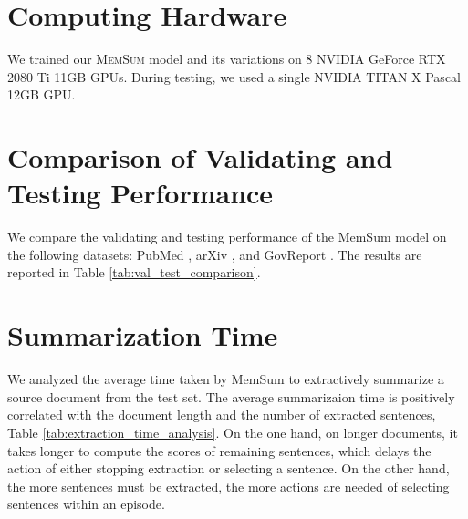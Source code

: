 \documentclass[11pt]{article}
\begin{document}
\section{Computing Hardware}
We trained our \textsc{MemSum} model and its variations on 8 NVIDIA GeForce RTX 2080 Ti 11GB GPUs. During testing, we used a single NVIDIA TITAN X Pascal 12GB GPU.

\section{Comparison of Validating and Testing Performance }

We compare the validating and testing performance of the MemSum model on the following datasets: PubMed \cite{cohan2018discourse}, arXiv \cite{cohan2018discourse}, and GovReport \cite{huang2021efficient}. The results are reported in Table \ref{tab:val_test_comparison}.

\section{Summarization Time}
\label{sec:ref_sum_time}
We analyzed the average time taken by MemSum to extractively summarize a source document from the test set. The average summarizaion time is positively correlated with the document length and the number of extracted sentences, Table \ref{tab:extraction_time_analysis}. On the one hand, on longer documents, it takes longer to compute the scores of remaining sentences, which delays the action of either stopping extraction or selecting a sentence. On the other hand, the more sentences must be extracted, the more actions are needed of selecting sentences within an episode. 
\begin{table}
\setlength\tabcolsep{3pt} 
\centering
{}
\caption{ \label{tab:val_test_comparison} Validating and testing scores of the MemSum model tested on the PubMed, the arXiv and the GovReport datasets. }
\end{table}
\end{document}
